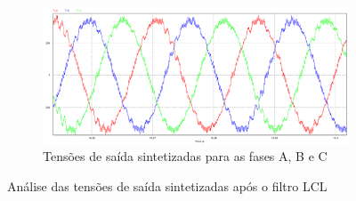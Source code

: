 \begin{figure}[!hbt]
	\begin{subfigure}[b]{\textwidth}
		\includegraphics[width=\textwidth]{figuras/sim_figures/sistema_completo/tensao_saida_inversor_4.PNG}
		\caption{Tensões de saída sintetizadas para as fases A, B e C}
	\end{subfigure}
    \caption{Análise das tensões de saída sintetizadas após o filtro LCL}
    \label{fig:sim-tensao-saida-inversor}
\end{figure}

